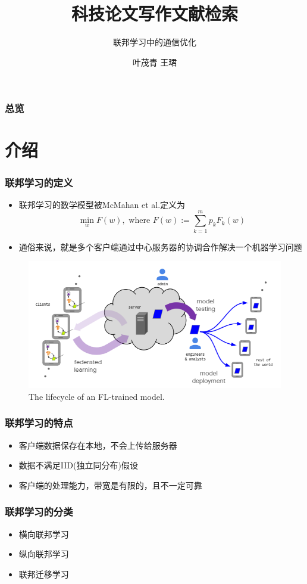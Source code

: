 \documentclass[hyperref={pdfpagelabels=false}]{beamer}
\title{科技论文写作文献检索}
\subtitle{联邦学习中的通信优化}
\author{叶茂青 \quad 王珺}
\date{\displaydate{date}}
\begin{document}
\begin{frame}
\titlepage
\end{frame} 

\begin{frame}
	\frametitle{总览}
	\tableofcontents
\end{frame} 

\section{介绍}
\begin{frame}
	\tableofcontents[currentsection]
\end{frame} 

\begin{frame}
	\frametitle{联邦学习的定义}
	\begin{itemize}
		\item 联邦学习的数学模型被McMahan et al.\cite{mcmahan2016communication}定义为$$\min _{w} F(w), \text { where } F(w):=\sum_{k=1}^{m} p_{k} F_{k}(w)$$
		\item 通俗来说，就是多个客户端通过中心服务器的协调合作解决一个机器学习问题
	\end{itemize}
	\begin{figure}
		\centering
		\includegraphics[width=.6\textwidth]{./figure/1.png}
		\caption{The lifecycle of an FL-trained model.\cite{kairouz2019advances}}
	\end{figure}
\end{frame}


\begin{frame}
	\frametitle{联邦学习的特点}
	\begin{itemize}
		\item<+-> 客户端数据保存在本地，不会上传给服务器
		\item<+-> 数据不满足IID(独立同分布)假设
		\item<+-> 客户端的处理能力，带宽是有限的，且不一定可靠
	\end{itemize}
\end{frame}

\begin{frame}
	\frametitle{联邦学习的分类}
	\begin{itemize}
		\item 横向联邦学习
		\item 纵向联邦学习
		\item 联邦迁移学习
	\end{itemize}
\end{frame}
\end{document}
